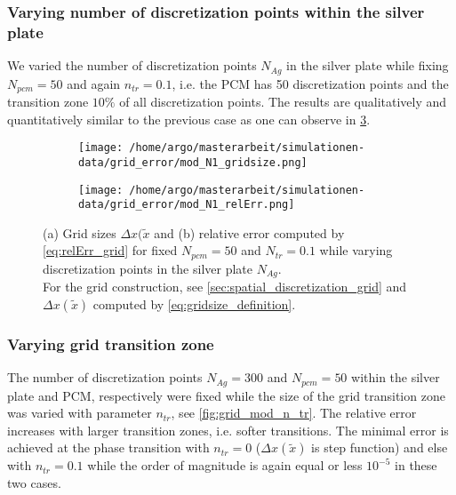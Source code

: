 \documentclass{scrartcl}[12pt, halfparskip]
\numberwithin{equation}{section}
\numberwithin{figure}{section}
\numberwithin{table}{section}
\begin{document}
\subsubsection{Varying number of discretization points within the silver plate}
We varied the number of discretization points $N_{Ag}$ in the silver plate while fixing $N_{pcm}=50$ and again $n_{tr}=0.1$, i.e. the PCM has 50 discretization points and the transition zone $10\%$ of all discretization points. The results are qualitatively and quantitatively similar to the previous case as one can observe in \cref{fig:grid_mod_N1}.


\begin{figure}[H]
	\begin{subfigure}{0.49\textwidth}
		\texttt{[image: /home/argo/masterarbeit/simulationen-data/grid\_error/mod\_N1\_gridsize.png]}
		\caption{}
		\label{fig:gridsize_mod_N1}
	\end{subfigure}
	\begin{subfigure}{0.49\textwidth}
		\texttt{[image: /home/argo/masterarbeit/simulationen-data/grid\_error/mod\_N1\_relErr.png]}
		\caption{}
		\label{fig:grid_relErr_mod_N1}
	\end{subfigure}
	\caption{(a) Grid sizes $\Delta x(\tilde{x}$ and (b) relative error computed by \cref{eq:relErr_grid} for fixed $N_{pcm}=50$ and $N_{tr}=0.1$ while varying discretization points in the silver plate $N_{Ag}$. \\
	For the grid construction, see \cref{sec:spatial_discretization_grid} and $\Delta x(\tilde{x})$ computed by \cref{eq:gridsize_definition}.}
	\label{fig:grid_mod_N1}
\end{figure}


\subsubsection{Varying grid transition zone}
The number of discretization points $N_{Ag}=300$ and $N_{pcm}=50$ within the silver plate and PCM, respectively were fixed while the size of the grid transition zone was varied with parameter $n_{tr}$, see \cref{fig:grid_mod_n_tr}. The relative error increases with larger transition zones, i.e. softer transitions. The minimal error is achieved at the phase transition with $n_{tr}=0$ ($\Delta x(\tilde{x})$ is step function) and else with $n_{tr}=0.1$ while the order of magnitude is again equal or less $10^{-5}$ in these two cases.
\end{document}
